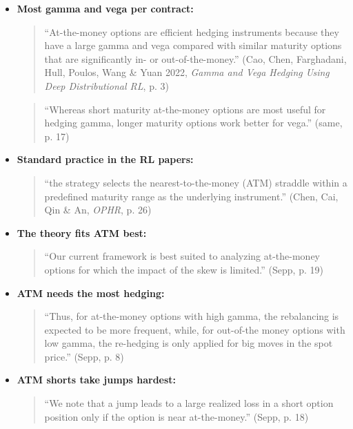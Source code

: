 \documentclass{article}
\begin{document}
\begin{itemize}

\item \textbf{Most gamma and vega per contract:}

\begin{quote}``At-the-money options are efficient hedging instruments because they have a large gamma and vega compared with similar maturity options that are significantly in- or out-of-the-money.'' (Cao, Chen, Farghadani, Hull, Poulos, Wang \& Yuan 2022, \emph{Gamma and Vega Hedging Using Deep Distributional RL}, p. 3)\end{quote}

\begin{quote}``Whereas short maturity at-the-money options are most useful for hedging gamma, longer maturity options work better for vega.'' (same, p. 17)\end{quote}

\item \textbf{Standard practice in the RL papers:}

\begin{quote}``the strategy selects the nearest-to-the-money (ATM) straddle within a predefined maturity range as the underlying instrument.'' (Chen, Cai, Qin \& An, \emph{OPHR}, p. 26)\end{quote}

\item \textbf{The theory fits ATM best:}

\begin{quote}``Our current framework is best suited to analyzing at-the-money options for which the impact of the skew is limited.'' (Sepp, p. 19)\end{quote}

\item \textbf{ATM needs the most hedging:}

\begin{quote}``Thus, for at-the-money options with high gamma, the rebalancing is expected to be more frequent, while, for out-of-the money options with low gamma, the re-hedging is only applied for big moves in the spot price.'' (Sepp, p. 8)\end{quote}

\item \textbf{ATM shorts take jumps hardest:}

\begin{quote}``We note that a jump leads to a large realized loss in a short option position only if the option is near at-the-money.'' (Sepp, p. 18)\end{quote}

\end{itemize}
\end{document}
